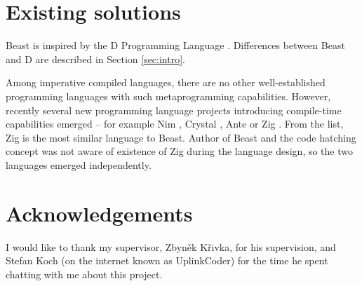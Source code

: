\documentclass{ExcelAtFIT}
\begin{document}
\begin{comment}
There is still a big difference between \ctime and \nonctime variables. First, this "runtime mirroring" is not necessary at all in a lot of practical use cases. Second, the mirroring can be a lot faster than runtime execution -- mirroring does not require the evaluation to be done at runtime, a simple memory overwrite with newer values (and only where the \ctime data changed since the last mirroring) is enough.

The compiler has a virtual memory address space that is used during interpretation. This address space is different from the address space of an output binary file. Since it is possible to have references (and pointers) during compile time, it is necessary to implement address translation between these two address spaces. Because of that, the compiler has to know what data in the virtual memory is a reference, because values of \ctime references are changed during the linking process. This is realized by dedicated interpreter instructions called within reference (pointer) constructor/destructors that mark/unmark the memory as a reference.

This text briefly describes all key components necessary to implement the code hatching concept. More in-depth analysis can be found in bachelor thesis downloadable from the Git repository.
\end{comment} 

\section{Existing solutions}
Beast is inspired by the D Programming Language \cite{DLang}. Differences between Beast and D are described in Section \ref{sec:intro}.

Among imperative compiled languages, there are no other well-established programming languages with such metaprogramming capabilities. However, recently several new programming language projects introducing compile-time capabilities emerged -- for example Nim \cite{NimLang}, Crystal \cite{CrystalLang}, Ante \cite{AnteLang} or Zig \cite{ZigLang}. From the list, Zig is the most similar language to Beast. Author of Beast and the code hatching concept was not aware of existence of Zig during the language design, so the two languages emerged independently.

\section*{Acknowledgements}
I would like to thank my supervisor, Zbyněk Křivka, for his supervision, and Stefan Koch (on the internet known as UplinkCoder) for the time he spent chatting with me about this project.
\end{document}
